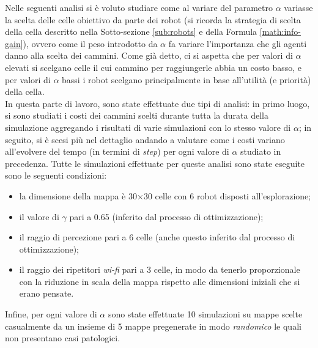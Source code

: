 Nelle seguenti analisi si è voluto studiare come al variare del parametro $\alpha$ variasse la scelta delle celle obiettivo da parte dei robot (si ricorda la strategia di scelta della cella descritto nella Sotto-sezione \ref{sub:robots} e della Formula \ref{math:info-gain}), ovvero come il peso introdotto da $\alpha$ fa variare l'importanza che gli agenti danno alla scelta dei cammini.
Come già detto, ci si aspetta che per valori di $\alpha$ elevati si scelgano celle il cui cammino per raggiungerle abbia un costo basso, e per valori di $\alpha$ bassi i robot scelgano principalmente in base all'utilità (e priorità) della cella.\\
In questa parte di lavoro, sono state effettuate due tipi di analisi: in primo luogo, si sono studiati i costi dei cammini scelti durante tutta la durata della simulazione aggregando i risultati di varie simulazioni con lo stesso valore di $\alpha$; in seguito, si è scesi più nel dettaglio andando a valutare come i costi variano all'evolvere del tempo (in termini di \textit{step}) per ogni valore di $\alpha$ studiato in precedenza.
Tutte le simulazioni effettuate per queste analisi sono state eseguite sono le seguenti condizioni:
\begin{itemize}
	\item la dimensione della mappa è 30$\times$30 celle con 6 robot disposti all'esplorazione;
	\item il valore di $\gamma$ pari a 0.65 (inferito dal processo di ottimizzazione);
	\item il raggio di percezione pari a 6 celle (anche questo inferito dal processo di ottimizzazione);
	\item il raggio dei ripetitori \textit{wi-fi} pari a 3 celle, in modo da tenerlo proporzionale con la riduzione in scala della mappa rispetto alle dimensioni iniziali che si erano pensate.
\end{itemize}
Infine, per ogni valore di $\alpha$ sono state effettuate 10 simulazioni su mappe scelte casualmente da un insieme di 5 mappe pregenerate in modo \textit{randomico} le quali non presentano casi patologici.

